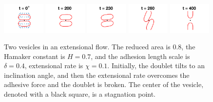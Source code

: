 \documentclass[prf,superscriptaddress,showpacs]{revtex4-1}
\begin{document}
\begin{figure}[htp]
  \includegraphics[width = 0.19\textwidth,trim={5cm 2cm 5cm 1cm},clip]{figs/extensional_adR4em1adS7em1Chi1em1_ra080_image01.png}
  \includegraphics[width = 0.19\textwidth,trim={5cm 2cm 5cm 1cm},clip]{figs/extensional_adR4em1adS7em1Chi1em1_ra080_image02.png}
  \includegraphics[width = 0.19\textwidth,trim={5cm 2cm 5cm 1cm},clip]{figs/extensional_adR4em1adS7em1Chi1em1_ra080_image03.png}
  \includegraphics[width = 0.19\textwidth,trim={5cm 2cm 5cm 1cm},clip]{figs/extensional_adR4em1adS7em1Chi1em1_ra080_image04.png}
  \includegraphics[width = 0.19\textwidth,trim={5cm 2cm 5cm 1cm},clip]{figs/extensional_adR4em1adS7em1Chi1em1_ra080_image05.png}
  \caption{\label{fig:extensional3} Two vesicles in an extensional flow.
  The reduced area is $0.8$, the Hamaker constant is $H = 0.7$, and the
  adhesion length scale is $\delta = 0.4$, extensional rate is $\chi =
  0.1$.  Initially, the doublet tilts to an inclination angle, and then
  the extensional rate overcomes the adhesive force and the doublet is
  broken.  The center of the vesicle, denoted with a black square, is a
  stagnation point.}
\end{figure}
\end{document}
